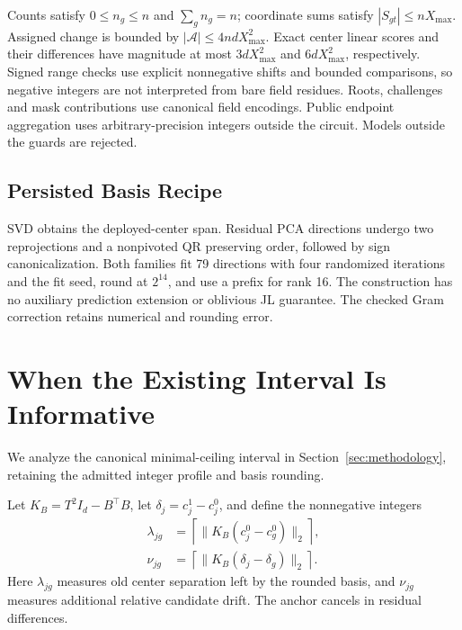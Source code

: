 \documentclass[5p,times,twocolumn]{elsarticle}
\begin{document}
Counts satisfy $0\leq n_g\leq n$ and $\sum_g n_g=n$;
coordinate sums satisfy $|S_{gt}|\leq nX_{\max}$. Assigned change is bounded
by $|\mathcal A|\leq4ndX_{\max}^2$. Exact center linear scores and their
differences have magnitude at most $3dX_{\max}^2$ and $6dX_{\max}^2$,
respectively. Signed range checks use explicit nonnegative shifts and
bounded comparisons, so negative integers are not interpreted from bare
field residues. Roots, challenges and mask contributions use canonical
field encodings. Public endpoint aggregation uses arbitrary-precision
integers outside the circuit. Models outside the guards are rejected.

\subsection{Persisted Basis Recipe}
SVD obtains the deployed-center span. Residual PCA directions undergo two
reprojections and a nonpivoted QR preserving order, followed by sign
canonicalization. Both families fit 79 directions with four randomized
iterations and the fit seed, round at $2^{14}$, and use a prefix for rank 16.
The construction has no auxiliary prediction extension or oblivious JL
guarantee. The checked Gram correction retains numerical and rounding error.



\section{When the Existing Interval Is Informative}
\label{app:informativeness}
We analyze the canonical minimal-ceiling interval in
Section~\ref{sec:methodology}, retaining the admitted integer profile and
basis rounding.

Let $K_B=T^2I_d-B^\top B$, let
$\delta_j=c^1_j-c^0_j$, and define the nonnegative integers
\begin{align}
 \lambda_{jg}&=\left\lceil\|K_B(c^0_j-c^0_g)\|_2\right\rceil,\nonumber\\
 \nu_{jg}&=\left\lceil\|K_B(\delta_j-\delta_g)\|_2\right\rceil.
 \label{eq:inform-drift}
\end{align}
Here $\lambda_{jg}$ measures old center separation left by the rounded
basis, and $\nu_{jg}$ measures additional relative candidate drift.
The anchor cancels in residual differences.
\end{document}
